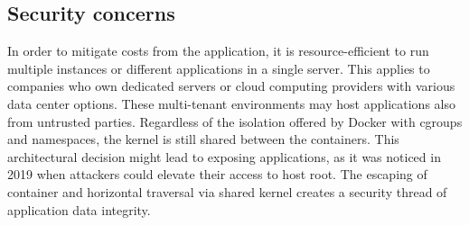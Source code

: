 \subsection{Security concerns}

In order to mitigate costs from the application, it is resource-efficient to run multiple instances or different applications in a single server. This applies to companies who own dedicated servers or cloud computing providers with various data center options. These multi-tenant environments may host applications also from untrusted parties. Regardless of the isolation offered by Docker with cgroups and namespaces, the kernel is still shared between the containers. This architectural decision might lead to exposing applications, as it was noticed in 2019 \cite{CVE-2020-14386}\cite{CVE-2019-5736} when attackers could elevate their access to host root. The escaping of container and horizontal traversal via shared kernel creates a security thread of application data integrity.



